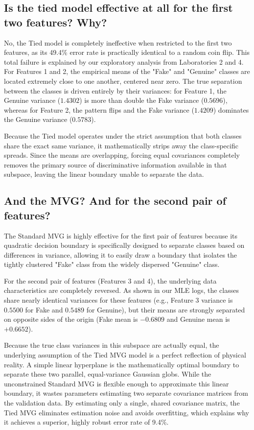 \subsection*{Is the tied model effective at all for the first two features? Why?}

No, the Tied model is completely ineffective when restricted to the first two features, as its 49.4\% error rate is practically identical to a random coin flip. This total failure is explained by our exploratory analysis from Laboratories 2 and 4. For Features 1 and 2, the empirical means of the "Fake" and "Genuine" classes are located extremely close to one another, centered near zero. The true separation between the classes is driven entirely by their variances: for Feature 1, the Genuine variance ($1.4302$) is more than double the Fake variance ($0.5696$), whereas for Feature 2, the pattern flips and the Fake variance ($1.4209$) dominates the Genuine variance ($0.5783$). 

Because the Tied model operates under the strict assumption that both classes share the exact same variance, it mathematically strips away the class-specific spreads. Since the means are overlapping, forcing equal covariances completely removes the primary source of discriminative information available in that subspace, leaving the linear boundary unable to separate the data.

\subsection*{And the MVG? And for the second pair of features?}

The Standard MVG is highly effective for the first pair of features because its quadratic decision boundary is specifically designed to separate classes based on differences in variance, allowing it to easily draw a boundary that isolates the tightly clustered "Fake" class from the widely dispersed "Genuine" class.

For the second pair of features (Features 3 and 4), the underlying data characteristics are completely reversed. As shown in our MLE logs, the classes share nearly identical variances for these features (e.g., Feature 3 variance is $0.5500$ for Fake and $0.5489$ for Genuine), but their means are strongly separated on opposite sides of the origin (Fake mean is $-0.6809$ and Genuine mean is $+0.6652$). 

Because the true class variances in this subspace are actually equal, the underlying assumption of the Tied MVG model is a perfect reflection of physical reality. A simple linear hyperplane is the mathematically optimal boundary to separate these two parallel, equal-variance Gaussian globs. While the unconstrained Standard MVG is flexible enough to approximate this linear boundary, it wastes parameters estimating two separate covariance matrices from the validation data. By estimating only a single, shared covariance matrix, the Tied MVG eliminates estimation noise and avoids overfitting, which explains why it achieves a superior, highly robust error rate of 9.4\%.
